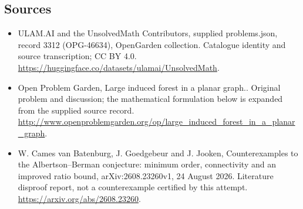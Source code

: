 \documentclass[11pt,a4paper]{article}
\begin{document}
\subsection{Sources}
\begin{itemize}
\item[S1] ULAM.AI and the UnsolvedMath Contributors, supplied problems.json, record 3312 (OPG-46634), OpenGarden collection. Catalogue identity and source transcription; CC BY 4.0.
\url{https://huggingface.co/datasets/ulamai/UnsolvedMath}.
\item[S2] Open Problem Garden, Large induced forest in a planar graph.. Original problem and discussion; the mathematical formulation below is expanded from the supplied source record.
\url{http://www.openproblemgarden.org/op/large_induced_forest_in_a_planar_graph}.
\item[S3] W. Cames van Batenburg, J. Goedgebeur and J. Jooken, Counterexamples to the Albertson--Berman conjecture: minimum order, connectivity and an improved ratio bound, arXiv:2608.23260v1, 24 August 2026. Literature disproof report, not a counterexample certified by this attempt.
\url{https://arxiv.org/abs/2608.23260}.
\end{itemize}
\end{document}
